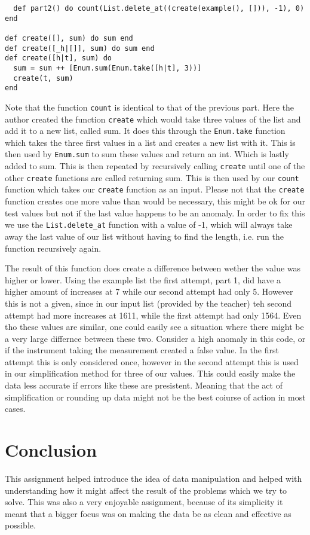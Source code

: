 \documentclass[a4paper,11pt]{article}
\begin{document}
\begin{verbatim}
  def part2() do count(List.delete_at((create(example(), [])), -1), 0) end

def create([], sum) do sum end
def create([_h|[]], sum) do sum end
def create([h|t], sum) do
  sum = sum ++ [Enum.sum(Enum.take([h|t], 3))]
  create(t, sum)
end
\end{verbatim}

Note that the function {\tt count} is identical to that of the previous part. 
Here the author created the function {\tt create} which would take three values of the list and add it to a new list, called sum. It does this through the {\tt Enum.take} function which takes the three first values in a list and creates a new list with it. This is then used by {\tt Enum.sum} to sum these values and return an int. Which is lastly added to sum. This is then repeated by recursively calling {\tt create} until one of the other {\tt create} functions are called returning sum. This is then used by our {\tt count} function which takes our {\tt create} function as an input. Please not that the {\tt create} function creates one more value than would be necessary, this might be ok for our test values but not if the last value happens to be an anomaly. In order to fix this we use the {\tt List.delete_at} function with a value of -1, which will always take away the last value of our list without having to find the length, i.e. run the function recursively again. 

The result of this function does create a difference between wether the value was higher or lower. Using the example list the first attempt, part 1, did have a higher amount of increases at 7 while our second attempt had only 5. However this is not a given, since in our input list (provided by the teacher) teh second attempt had more increases at 1611, while the first attempt had only 1564. Even tho these values are similar, one could easily see a situation where there might be a very large differnce between these two. Consider a high anomaly in this code, or if the instrument taking the measurement created a false value. In the first attempt this is only considered once, however in the second attempt this is used in our simplification method for three of our values. This could easily make the data less accurate if errors like these are presistent. Meaning that the act of simplification or rounding up data might not be the best coiurse of action in most cases.

\section*{Conclusion}

This assignment helped introduce the idea of data manipulation and helped with understanding how it might affect the result of the problems which we try to solve. This was also a very enjoyable assignment, because of its simplicity it meant that a bigger focus was on making the data be as clean and effective as possible.
\end{document}
